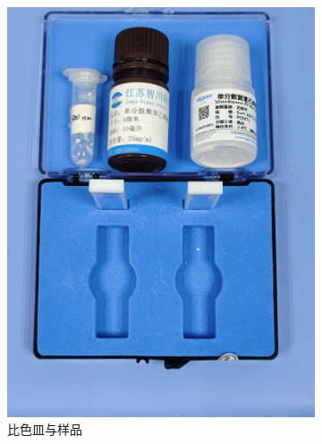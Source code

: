\documentclass[a4paper]{report} %
\begin{document}
\begin{figure}[htbp]
\begin{subfigure}{0.22\textwidth}
        \includegraphics[width=\linewidth]{比色皿.jpg}
        \caption{比色皿与样品}
    \end{subfigure}
    \begin{subfigure}{0.22\textwidth}

\end{subfigure}
\end{figure}
\end{document}
